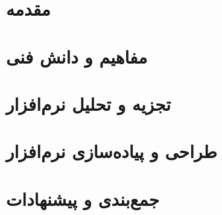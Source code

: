 \documentclass[12pt,a4paper,oneside]{report}
\begin{document}

\thispagestyle{plain}
\tableofcontents
\listoffigures



\chapter{مقدمه}\clearpage


\chapter{مفاهیم و دانش فنی}\clearpage


\chapter{تجزیه و تحلیل نرم‌افزار}\clearpage


\chapter{طراحی و پیاده‌سازی نرم‌افزار}\clearpage


\chapter{جمع‌بندی و پیشنهادات}\clearpage

%



%
%

\end{document}
